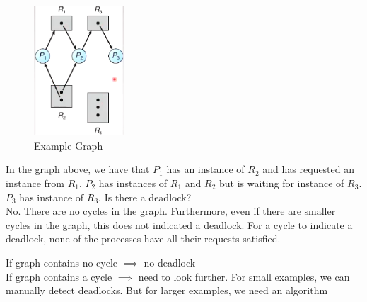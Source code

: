 \documentclass[a4paper]{article}
\theoremstyle{plain}
\theoremstyle{definition}
\newtheorem{defn}{Definition}[section]
\newtheorem{exmp}{Example}[section]
\theoremstyle{remark}
\begin{document}
\begin{tcolorbox}[colback=black!3!white,colframe=black!60!white,title=\begin{exmp}Resource Allocation Graph Example \label{Resource Allocation Graph Example}\end{exmp}]
        \begin{figure}[H]
        	\centering
        	\includegraphics[width=0.3\textwidth]{sixtyeight.png}
        	\caption{Example Graph}
        	\label{fig:sixtyeight-png}
        \end{figure}
In the graph above, we have that $P_1$ has an instance of $R_2$ and has requested an instance from $R_1$. $P_2$ has instances of $R_1$ and $R_2$ but is waiting for instance of $R_3$. $P_3$ has instance of $R_3$. Is there a deadlock?\\
No. There are no cycles in the graph. Furthermore, even if there are smaller cycles in the graph, this does not indicated a deadlock. For a cycle to indicate a deadlock, none of the processes have all their requests satisfied.
\end{tcolorbox}
\begin{tcolorbox}[colback=black!3!white,colframe=black!60!white,title=\begin{defn}Conclusion for Graph \label{Conclusion for Graph}\end{defn}]
If graph contains no cycle $\implies$ no deadlock \\
If graph contains a cycle $\implies$ need to look further. For small examples, we can manually detect deadlocks. But for larger examples, we need an algorithm
\end{tcolorbox}
\end{document}
